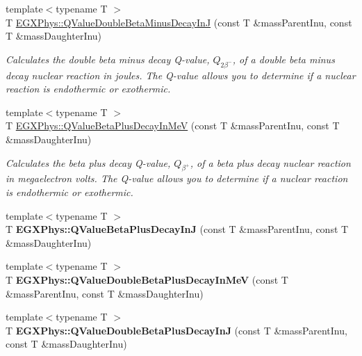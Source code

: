 \begin{DoxyCompactItemize}
{\footnotesize template$<$typename T $>$ }\\T \hyperlink{group___q_value_gaf19d189152aec04d8b1ebbbe8792540b}{E\+G\+X\+Phys\+::\+Q\+Value\+Double\+Beta\+Minus\+Decay\+InJ} (const T \&mass\+Parent\+Inu, const T \&mass\+Daughter\+Inu)
\begin{DoxyCompactList}\small\item\em Calculates the double beta minus decay Q-\/value, $Q_{2\beta^-}$, of a double beta minus decay nuclear reaction in joules. The Q-\/value allows you to determine if a nuclear reaction is endothermic or exothermic. \end{DoxyCompactList}\item 
{\footnotesize template$<$typename T $>$ }\\T \hyperlink{group___q_value_ga9bf549cd4f8e1c76e9cc41b72d4f0279}{E\+G\+X\+Phys\+::\+Q\+Value\+Beta\+Plus\+Decay\+In\+MeV} (const T \&mass\+Parent\+Inu, const T \&mass\+Daughter\+Inu)
\begin{DoxyCompactList}\small\item\em Calculates the beta plus decay Q-\/value, $Q_{\beta^+}$, of a beta plus decay nuclear reaction in megaelectron volts. The Q-\/value allows you to determine if a nuclear reaction is endothermic or exothermic. \end{DoxyCompactList}\item 
\mbox{\label{group___q_value_ga066fe9a9816a204c801c557a85bc60df}} 
{\footnotesize template$<$typename T $>$ }\\T {\bfseries E\+G\+X\+Phys\+::\+Q\+Value\+Beta\+Plus\+Decay\+InJ} (const T \&mass\+Parent\+Inu, const T \&mass\+Daughter\+Inu)
\item 
\mbox{\label{group___q_value_ga3fb4b374bc1df69b96a66d0488bb2ba1}} 
{\footnotesize template$<$typename T $>$ }\\T {\bfseries E\+G\+X\+Phys\+::\+Q\+Value\+Double\+Beta\+Plus\+Decay\+In\+MeV} (const T \&mass\+Parent\+Inu, const T \&mass\+Daughter\+Inu)
\item 
\mbox{\label{group___q_value_ga7d8dcc2691c2d4de9132e758e149ba51}} 
{\footnotesize template$<$typename T $>$ }\\T {\bfseries E\+G\+X\+Phys\+::\+Q\+Value\+Double\+Beta\+Plus\+Decay\+InJ} (const T \&mass\+Parent\+Inu, const T \&mass\+Daughter\+Inu)
\item 
\mbox{\label{group___q_value_ga9a6b76207e2ec60fd0ee3511582f9e26}} 

\end{DoxyCompactItemize}
